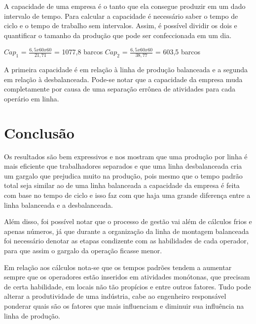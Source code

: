 \documentclass[
	12pt,				%
	oneside,			%
	a4paper,			%
	english,			%
	french,				%
	spanish,			%
	brazil,				%
	]{abntex2}
\begin{document}
A capacidade de uma empresa é o tanto que ela consegue produzir em um dado intervalo de tempo. Para calcular a capacidade é necessário saber o tempo de ciclo e o tempo de trabalho sem intervalos. Assim, é possível dividir os dois e quantificar o tamanho da produção que pode ser confeccionada em um dia.

$Cap_1$ = $\frac{6,5x60x60}{21,71}$ = 1077,8 barcos \quad	$Cap_2$ = $\frac{6,5x60x60}{38,77}$ = 603,5 barcos

A primeira capacidade é em relação à linha de produção balanceada e a segunda em relação à desbalanceada. Pode-se notar que a capacidade da empresa muda completamente por causa de uma separação errônea de atividades para cada operário em linha. 




\newpage
\section[Conclusão]{Conclusão}
\pagestyle{fancy}

Os resultados são bem expressivos e nos mostram que uma produção por linha é mais eficiente que trabalhadores separados e que uma linha desbalanceada cria um gargalo que prejudica muito na produção, pois mesmo que o tempo padrão total seja similar ao de uma linha balanceada a capacidade da empresa é feita com base no tempo de ciclo e isso faz com que haja uma grande diferença entre a linha balanceada e a desbalanceada.

Além disso, foi possível notar que o processo de gestão vai além de cálculos frios e apenas números, já que durante a organização da linha de montagem balanceada foi necessário denotar as etapas condizente com as habilidades de cada operador, para que assim o gargalo da operação ficasse menor.

Em relação aos cálculos nota-se que os tempos padrões tendem a aumentar sempre que os operadores estão inseridos em atividades monótonas, que precisam de certa habilidade, em locais não tão propícios e entre outros fatores. Tudo pode alterar a produtividade de uma indústria, cabe ao engenheiro responsável ponderar quais são os fatores que mais influenciam e diminuir sua influência na linha de produção.
%
%
\end{document}
